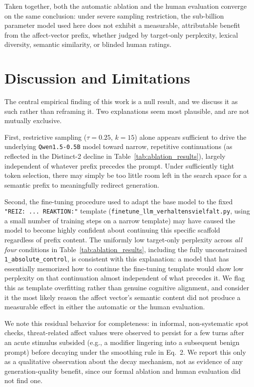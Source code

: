 \documentclass[10pt,twocolumn]{article}
\begin{document}
Taken together, both the automatic ablation and the human evaluation converge on the same conclusion: under severe sampling restriction, the sub-billion parameter model used here does not exhibit a measurable, attributable benefit from the affect-vector prefix, whether judged by target-only perplexity, lexical diversity, semantic similarity, or blinded human ratings.


\section{Discussion and Limitations}
The central empirical finding of this work is a null result, and we discuss it as such rather than reframing it. Two explanations seem most plausible, and are not mutually exclusive.

First, restrictive sampling ($\tau=0.25$, $k=15$) alone appears sufficient to drive the underlying \texttt{Qwen1.5-0.5B} model toward narrow, repetitive continuations (as reflected in the Distinct-2 decline in Table~\ref{tab:ablation_results}), largely independent of whatever prefix precedes the prompt. Under sufficiently tight token selection, there may simply be too little room left in the search space for a semantic prefix to meaningfully redirect generation.

Second, the fine-tuning procedure used to adapt the base model to the fixed \texttt{"REIZ: ... REAKTION:"} template (\texttt{finetune\_llm\_verhaltensvielfalt.py}, using a small number of training steps on a narrow template) may have caused the model to become highly confident about continuing this specific scaffold regardless of prefix content. The uniformly low target-only perplexity across \emph{all four} conditions in Table~\ref{tab:ablation_results}, including the fully unconstrained \texttt{1\_absolute\_control}, is consistent with this explanation: a model that has essentially memorized how to continue the fine-tuning template would show low perplexity on that continuation almost independent of what precedes it. We flag this as template overfitting rather than genuine cognitive alignment, and consider it the most likely reason the affect vector's semantic content did not produce a measurable effect in either the automatic or the human evaluation.

We note this residual behavior for completeness: in informal, non-systematic spot checks, threat-related affect values were observed to persist for a few turns after an acute stimulus subsided (e.g., a modifier lingering into a subsequent benign prompt) before decaying under the smoothing rule in Eq.~2. We report this only as a qualitative observation about the decay mechanism, not as evidence of any generation-quality benefit, since our formal ablation and human evaluation did not find one.
\end{document}
